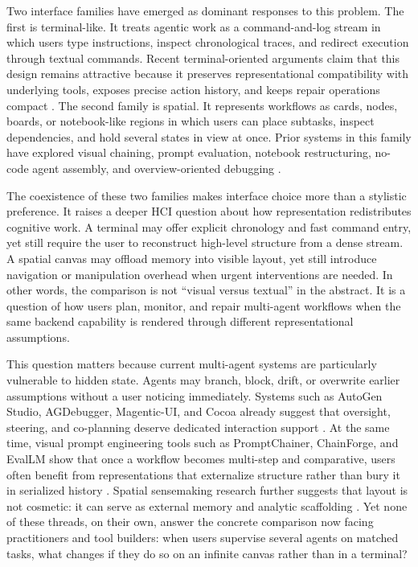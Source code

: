 \documentclass[sigconf]{acmart}
\begin{document}
Two interface families have emerged as dominant responses to this problem. The first is terminal-like. It treats agentic work as a command-and-log stream in which users type instructions, inspect chronological traces, and redirect execution through textual commands. Recent terminal-oriented arguments claim that this design remains attractive because it preserves representational compatibility with underlying tools, exposes precise action history, and keeps repair operations compact \cite{demasi2026terminal}. The second family is spatial. It represents workflows as cards, nodes, boards, or notebook-like regions in which users can place subtasks, inspect dependencies, and hold several states in view at once. Prior systems in this family have explored visual chaining, prompt evaluation, notebook restructuring, no-code agent assembly, and overview-oriented debugging \cite{wu2022promptchainer,mishra2025promptaid,arawjo2024chainforge,kim2024evallm,dibia2024autogen,epperson2025agdebugger,lin2025interlink}.

The coexistence of these two families makes interface choice more than a stylistic preference. It raises a deeper HCI question about how representation redistributes cognitive work. A terminal may offer explicit chronology and fast command entry, yet still require the user to reconstruct high-level structure from a dense stream. A spatial canvas may offload memory into visible layout, yet still introduce navigation or manipulation overhead when urgent interventions are needed. In other words, the comparison is not ``visual versus textual'' in the abstract. It is a question of how users plan, monitor, and repair multi-agent workflows when the same backend capability is rendered through different representational assumptions.

This question matters because current multi-agent systems are particularly vulnerable to hidden state. Agents may branch, block, drift, or overwrite earlier assumptions without a user noticing immediately. Systems such as AutoGen Studio, AGDebugger, Magentic-UI, and Cocoa already suggest that oversight, steering, and co-planning deserve dedicated interaction support \cite{dibia2024autogen,epperson2025agdebugger,mozannar2025magenticui,feng2026cocoa}. At the same time, visual prompt engineering tools such as PromptChainer, ChainForge, and EvalLM show that once a workflow becomes multi-step and comparative, users often benefit from representations that externalize structure rather than bury it in serialized history \cite{wu2022promptchainer,arawjo2024chainforge,kim2024evallm}. Spatial sensemaking research further suggests that layout is not cosmetic: it can serve as external memory and analytic scaffolding \cite{andrews2010space}. Yet none of these threads, on their own, answer the concrete comparison now facing practitioners and tool builders: when users supervise several agents on matched tasks, what changes if they do so on an infinite canvas rather than in a terminal?
\end{document}
